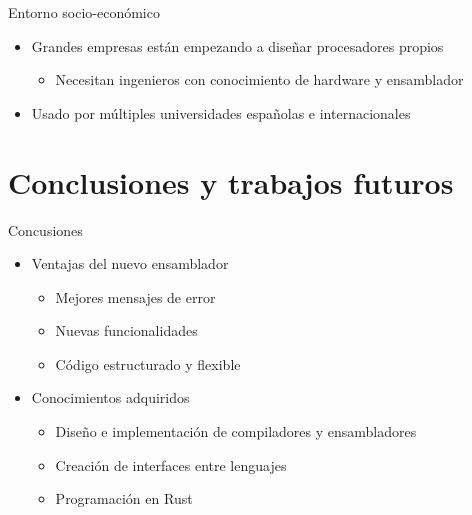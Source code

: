 \documentclass{beamer}
\begin{document}
    \begin{frame}{Entorno socio-económico}
        \begin{itemize}
            \item Grandes empresas están empezando a diseñar procesadores
            propios
            \begin{itemize}
                \item Necesitan ingenieros con conocimiento de hardware y
                ensamblador
            \end{itemize}
            \item Usado por múltiples universidades españolas e internacionales
        \end{itemize}
    \end{frame}

    \section{Conclusiones y trabajos futuros}

    \begin{frame}{Concusiones}
        \begin{itemize}
            \item Ventajas del nuevo ensamblador
            \begin{itemize}
                \item Mejores mensajes de error
                \item Nuevas funcionalidades
                \item Código estructurado y flexible
            \end{itemize}
            \item Conocimientos adquiridos
            \begin{itemize}
                \item Diseño e implementación de compiladores y ensambladores
                \item Creación de interfaces entre lenguajes
                \item Programación en Rust
            \end{itemize}
        \end{itemize}
    \end{frame}
\end{document}
